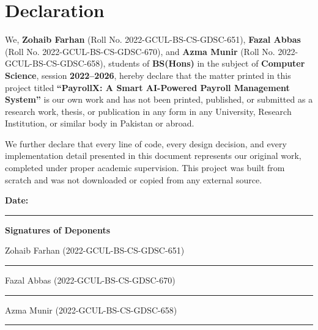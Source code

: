 \documentclass[12pt,a4paper]{report}
\begin{document}

\chapter*{Declaration}

We, \textbf{Zohaib Farhan} (Roll No. 2022-GCUL-BS-CS-GDSC-651), \textbf{Fazal Abbas} (Roll No. 2022-GCUL-BS-CS-GDSC-670), and \textbf{Azma Munir} (Roll No. 2022-GCUL-BS-CS-GDSC-658), students of \textbf{BS(Hons)} in the subject of \textbf{Computer Science}, session \textbf{2022--2026}, hereby declare that the matter printed in this project titled \textbf{``PayrollX: A Smart AI-Powered Payroll Management System''} is our own work and has not been printed, published, or submitted as a research work, thesis, or publication in any form in any University, Research Institution, or similar body in Pakistan or abroad.

We further declare that every line of code, every design decision, and every implementation detail presented in this document represents our original work, completed under proper academic supervision. This project was built from scratch and was not downloaded or copied from any external source.

\vspace{3cm}

\noindent\textbf{Date:} \rule{3cm}{0.4pt} \hfill \textbf{Signatures of Deponents}

\vspace{1cm}
\noindent\hfill Zohaib Farhan (2022-GCUL-BS-CS-GDSC-651) \rule{4cm}{0.4pt}

\vspace{0.5cm}
\noindent\hfill Fazal Abbas (2022-GCUL-BS-CS-GDSC-670) \rule{4cm}{0.4pt}

\vspace{0.5cm}
\noindent\hfill Azma Munir (2022-GCUL-BS-CS-GDSC-658) \rule{4cm}{0.4pt}

\end{document}
